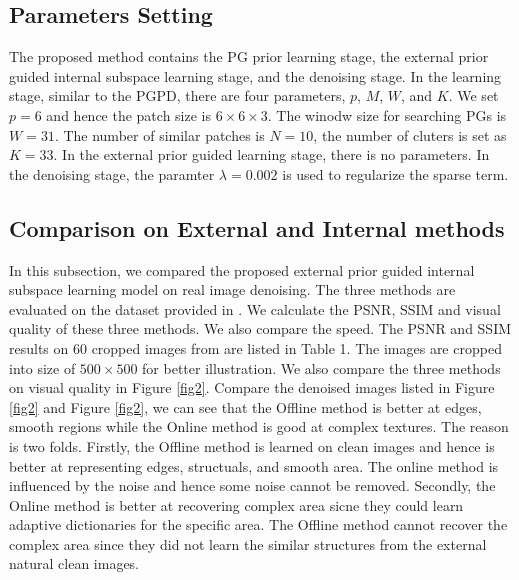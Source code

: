 \documentclass[10pt,twocolumn,letterpaper]{article}
\begin{document}
\subsection{Parameters Setting}
The proposed method contains the PG prior learning stage, the external prior guided internal subspace learning stage, and the denoising stage. In the learning stage, similar to the PGPD, there are four parameters, $p$, $M$, $W$, and $K$.  We set $p=6$ and hence the patch size is $6\times 6 \times 3$. The winodw size for searching PGs is $W = 31$. The number of similar patches is $N=10$, the number of cluters is set as $K = 33$. In the external prior guided learning stage, there is no parameters. In the denoising stage, the paramter $\lambda = 0.002$ is used to regularize the sparse term.


\subsection{Comparison on External and Internal methods}
In this subsection, we compared the proposed external prior guided internal subspace learning model on real image denoising. The three methods are evaluated on the dataset provided in \cite{crosschannel2016}. We calculate the PSNR, SSIM \cite{ssim} and visual quality of these three methods. We also compare the speed. The PSNR and SSIM results on 60 cropped images from \cite{crosschannel2016} are listed in Table 1. The images are cropped into size of $500\times 500$ for better illustration. We also compare the three methods on visual quality in Figure \ref{fig2}. Compare the denoised images listed in Figure \ref{fig2} and Figure \ref{fig2}, we can see that the Offline method is better at edges, smooth regions while the Online method is good at complex textures. The reason is two folds. Firstly, the Offline method is learned on clean images and hence is better at representing edges, structuals, and smooth area. The online method is influenced by the noise and hence some noise cannot be removed. Secondly, the Online method is better at recovering complex area sicne they could learn adaptive dictionaries for the specific area. The Offline method cannot recover the complex area since they did not learn the similar structures from the external natural clean images.
\end{document}
